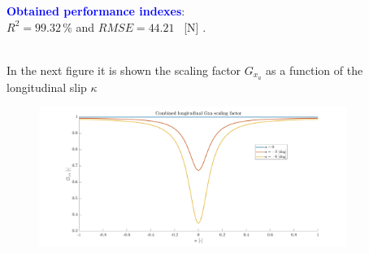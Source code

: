 \documentclass{IEEEtran}
\begin{document}
        \textbf{\textcolor{blue}{Obtained performance indexes}}: \\ $R^{2} = 99.32 \, \%$ and $RMSE = 44.21 $ \, [N] . \\\\

        \newpage
        
        In the next figure it is shown the scaling factor $G_{x_a}$  as a function of the longitudinal slip $\kappa$
        
        \begin{figure}[htbp]
            \centerline{\includegraphics[width = 3.95in]{combined_longitudinal_2.jpg}}
            
            \label{fig:GXa}
        \end{figure}

        
\end{document}
